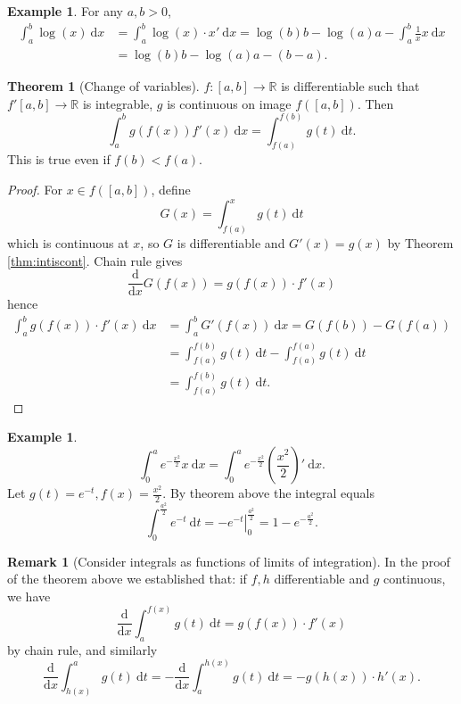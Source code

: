 \documentclass[a4paper]{article}
\theoremstyle{definition}
\newtheorem{thm}[defn]{Theorem}
\newtheorem{example}[defn]{Example}
\newtheorem*{remark}{Remark}
\begin{document}
\begin{example}
For any $a,b>0$,
\[
\begin{aligned}
    \int_a^b \log (x) \ \mathrm d x&=\int_a^b \log (x)\cdot x' \ \mathrm d x = \log (b)b-\log(a)a-\int_a^b \frac1x x \ \mathrm d x \\& = \log(b)b-\log(a)a-(b-a).
\end{aligned}
\]
\end{example}

\begin{thm}[Change of variables]
$f:[a,b]\rightarrow \mathbb R$ is differentiable such that $f'[a,b]\rightarrow \mathbb R$ is integrable, $g$ is continuous on image $f([a,b])$. Then
\[
\int_a^b g(f(x))f'(x) \ \mathrm d x = \int_{f(a)}^{f(b)}g(t) \ \mathrm d t .
\]
This is true even if $f(b)<f(a)$.
\end{thm}
\begin{proof}
For $x\in f([a,b])$, define
\[
G(x)=\int_{f(a)}^x g(t) \ \mathrm d t
\]
which is continuous at $x$, so $G$ is differentiable and $G'(x)=g(x)$ by Theorem \ref{thm:intiscont}. Chain rule gives
\[
\frac{\mathrm d}{\mathrm d x}G(f(x))=g(f(x))\cdot f'(x)
\]
hence
\[
\begin{aligned}
    \int_a^b g(f(x))\cdot f'(x) \ \mathrm d x &= \int_a^b G'(f(x)) \ \mathrm d x = G(f(b))-G(f(a)) \\ &= \int_{f(a)}^{f(b)} g(t) \ \mathrm d t - \int_{f(a)}^{f(a)} g(t) \ \mathrm d t \\ &= \int_{f(a)}^{f(b)} g(t) \ \mathrm d t .
\end{aligned}
\]
\end{proof}
\begin{example}
\[
\int_0^a e^{-\frac{x^2}{2}} x \ \mathrm d x=\int_0^a e^{-\frac{x^2}{2}} \left(\frac{x^2}{2}\right)' \ \mathrm d x .
\]
Let $g(t)=e^{-t},f(x)=\frac{x^2}{2}$. By theorem above the integral equals
\[
\int_0^{\frac{a^2}{2}} e^{-t} \ \mathrm d t=\left.-e^{-t}\right|_0^{\frac{a^2}{2}} = 1-e^{-\frac{a^2}{2}} .
\]
\end{example}
\begin{remark}[Consider integrals as functions of limits of integration]
In the proof of the theorem above we established that: if $f,h$ differentiable and $g$ continuous, we have
\[
\frac{\mathrm d}{\mathrm d x} \int_a^{f(x)}g(t) \ \mathrm d t=g(f(x))\cdot f'(x)
\]
by chain rule, and similarly
\[
\frac{\mathrm d}{\mathrm d x} \int_{h(x)}^a g(t) \ \mathrm d t=-\frac{\mathrm d}{\mathrm d x} \int_a^{h(x)} g(t) \ \mathrm d t=-g(h(x))\cdot h'(x).
\]
\end{remark}
\end{document}
